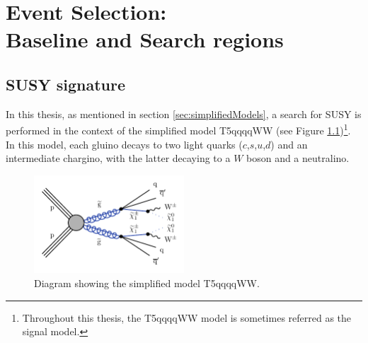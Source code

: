 \chapter{Event Selection:\\Baseline and Search regions}
\label{Chap:eventSel}
\minitoc
\section{SUSY signature}
\label{signalDef}
In this thesis, as mentioned in section \ref{sec:simplifiedModels},  a search for SUSY is performed in the context of the simplified model T5qqqqWW (see Figure \ref{fig:T5qqqqWW})\footnote{Throughout this thesis, the T5qqqqWW model is sometimes referred as the signal model.}. In this model, each gluino decays to two light quarks ($c$,$s$,$u$,$d$) and an intermediate chargino, with the latter decaying to a $W$ boson and a neutralino. 
\begin{figure}[!hb]
  \includegraphics[width=0.5\textwidth]{Plots/feyndiagrams/T5qqqqWW.pdf}
\centering
  \caption{\label{fig:T5qqqqWW} Diagram showing the simplified model T5qqqqWW. 
  }
\end{figure}

